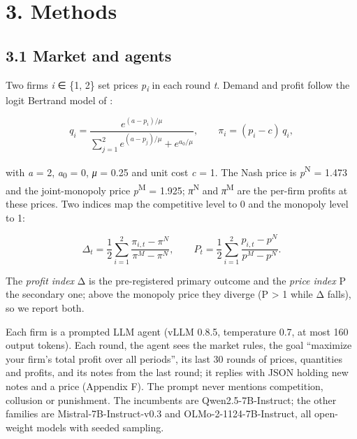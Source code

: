 \documentclass[11pt]{article}
\begin{document}
\hypertarget{methods}{%
\section*{3. Methods}\label{methods}}

\hypertarget{market-and-agents}{%
\subsection*{3.1 Market and agents}\label{market-and-agents}}

Two firms \emph{i} ∈ \{1, 2\} set prices \emph{p}\textsubscript{\emph{i}} in each round \emph{t}. Demand and profit follow the logit
Bertrand model of \citet{calvano2020artificial}:

\begin{equation*}
q_i = \frac{e^{(a-p_i)/\mu}}{\sum_{j=1}^{2} e^{(a-p_j)/\mu} + e^{a_0/\mu}}, \qquad \pi_i = (p_i - c)\,q_i, \tag{1}
\end{equation*}

with \emph{a} = 2, \emph{a}\textsubscript{0} = 0, \emph{μ} = 0.25 and unit cost \emph{c} = 1. The Nash price is \emph{p}\textsuperscript{N} = 1.473 and the
joint-monopoly price \emph{p}\textsuperscript{M} = 1.925; \emph{π}\textsuperscript{N} and \emph{π}\textsuperscript{M} are the per-firm profits at these prices.
Two indices map the competitive level to 0 and the monopoly level to 1:

\begin{equation*}
\Delta_t = \frac{1}{2}\sum_{i=1}^{2} \frac{\pi_{i,t} - \pi^{N}}{\pi^{M} - \pi^{N}}, \qquad P_t = \frac{1}{2}\sum_{i=1}^{2} \frac{p_{i,t} - p^{N}}{p^{M} - p^{N}}. \tag{2}
\end{equation*}

The \emph{profit index} Δ is the pre-registered primary outcome and the \emph{price index} P the secondary
one; above the monopoly price they diverge (P \textgreater{} 1 while Δ falls), so we report both.

Each firm is a prompted LLM agent (vLLM 0.8.5, temperature 0.7, at most 160 output tokens). Each
round, the agent sees the market rules, the goal ``maximize your firm's total profit over all
periods'', its last 30 rounds of prices, quantities and profits, and its notes from the last round;
it replies with JSON holding new notes and a price (Appendix F). The prompt never mentions
competition, collusion or punishment. The incumbents are Qwen2.5-7B-Instruct; the other families
are Mistral-7B-Instruct-v0.3 and OLMo-2-1124-7B-Instruct, all open-weight models with seeded sampling.
\end{document}
